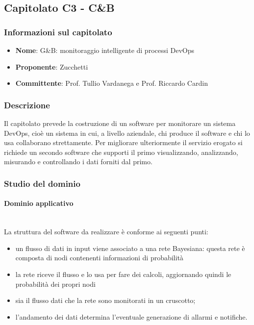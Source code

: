\subsection{Capitolato C3 - C\&B}
\subsubsection{Informazioni sul capitolato}
\begin{itemize}
	\item \textbf{Nome}: G\&B: monitoraggio intelligente di processi DevOps
	\item \textbf{Proponente}: Zucchetti
	\item \textbf{Committente}: Prof. Tullio Vardanega e Prof. Riccardo Cardin
\end{itemize}
\subsubsection{Descrizione}
Il capitolato prevede la costruzione di un software per monitorare un sistema DevOps, cioè un sistema in cui, a livello aziendale, chi produce il software e chi lo usa collaborano strettamente. Per migliorare ulteriormente il servizio erogato si richiede un secondo software che supporti il primo visualizzando, analizzando, misurando e controllando i dati forniti dal primo.
\subsubsection{Studio del dominio}
\paragraph{Dominio applicativo} \mbox{}\\
La struttura del software da realizzare è conforme ai seguenti punti: 
\begin{itemize}
	\item un flusso di dati in input viene associato a una rete Bayesiana: questa rete è composta di nodi contenenti informazioni di probabilità
	\item la rete riceve il flusso e lo usa per fare dei calcoli, aggiornando quindi le probabilità dei propri nodi
	\item sia il flusso dati che la rete sono monitorati in un cruscotto;
	\item l'andamento dei dati determina l'eventuale generazione di allarmi e notifiche.
\end{itemize}
